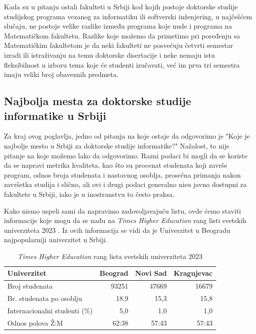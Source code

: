 \documentclass[a4paper]{article}
\begin{document}
Kada su u pitanju ostali fakulteti u Srbiji kod kojih postoje doktorske studije studijskog programa vezanog za informatiku ili softverski inženjering, u najčešćem slučaju, ne postoje velike razlike između programa koje nude i programa na Matematičkom fakultetu. Razlike koje možemo da primetimo pri poređenju sa Matematičkim fakultetom je da neki fakulteti ne posvećuju četvrti semestar izradi ili istraživanju na temu doktorske disertacije i neke nemaju istu fleksibilnost u izboru tema koje će studenti izučavati, već im prva tri semestra imaju veliki broj obaveznih predmeta.

\subsection{Najbolja mesta za doktorske studije informatike u Srbiji}

Za kraj ovog poglavlja, jedno od pitanja na koje ostaje da odgovorimo je "Koje je najbolje mesto u Srbiji za doktorske studije informatike?" Nažalost, to nije pitanje na koje možemo lako da odgovorimo. Razni podaci bi mogli da se koriste da se napravi metrika kvaliteta, kao što su procenat studenata koji završe program, odnos broja studenata i nastavnog osoblja, prosečna primanja nakon završetka studija i slično, ali ovi i drugi podaci generalno nisu javno dostupni za fakultete u Srbiji, iako je u inostranstvu to često praksa.

Kako nismo uspeli sami da napravimo zadovoljavajuću listu, ovde ćemo staviti informacije koje mogu da se nađu na \emph{Times Higher Education} rang listi svetskih univerziteta 2023 \cite{worldUniRanking}. Iz ovih informacija se vidi da je Univerzitet u Beogradu najpopularniji univerzitet u Srbiji.

\begin{table}[h!]
\begin{center}
\caption{\emph{Times Higher Education} rang lista svetskih univerziteta 2023}
\begin{tabular}{|l|r|r|r|} \hline
Univerzitet& Beograd& Novi Sad& Kragujevac\\ \hline
Broj studenata&93251&47669&16679\\ \hline
Br. studenata po osoblju & 18,9&15,3&15,8\\ \hline
Internacionalni studenti (\%) & 5,0&1,0&1,0\\ \hline
Odnos polova Ž:M& 62:38&57:43&57:43\\ \hline
\end{tabular}
\label{tab:tabela1}
\end{center}
\end{table}
\end{document}
